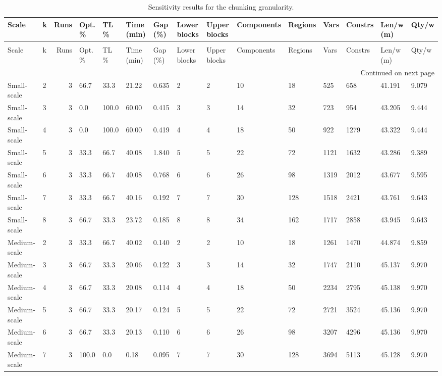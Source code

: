 \begin{longtable}{llrllllllllllll}
\caption{Sensitivity results for the chunking granularity.} \label{tab:app_chunking} \\
\toprule
Scale & k & Runs & Opt. \% & TL \% & Time (min) & Gap (\%) & Lower blocks & Upper blocks & Components & Regions & Vars & Constrs & Len/w (m) & Qty/w \\
\midrule
\endfirsthead
\caption[]{Sensitivity results for the chunking granularity.} \\
\toprule
Scale & k & Runs & Opt. \% & TL \% & Time (min) & Gap (\%) & Lower blocks & Upper blocks & Components & Regions & Vars & Constrs & Len/w (m) & Qty/w \\
\midrule
\endhead
\midrule
\multicolumn{15}{r}{Continued on next page} \\
\midrule
\endfoot
\bottomrule
\endlastfoot
Small-scale & 2 & 3 & 66.7 & 33.3 & 21.22 & 0.635 & 2 & 2 & 10 & 18 & 525 & 658 & 41.191 & 9.079 \\
Small-scale & 3 & 3 & 0.0 & 100.0 & 60.00 & 0.415 & 3 & 3 & 14 & 32 & 723 & 954 & 43.205 & 9.444 \\
Small-scale & 4 & 3 & 0.0 & 100.0 & 60.00 & 0.419 & 4 & 4 & 18 & 50 & 922 & 1279 & 43.322 & 9.444 \\
Small-scale & 5 & 3 & 33.3 & 66.7 & 40.08 & 1.840 & 5 & 5 & 22 & 72 & 1121 & 1632 & 43.286 & 9.389 \\
Small-scale & 6 & 3 & 33.3 & 66.7 & 40.08 & 0.768 & 6 & 6 & 26 & 98 & 1319 & 2012 & 43.677 & 9.595 \\
Small-scale & 7 & 3 & 33.3 & 66.7 & 40.16 & 0.192 & 7 & 7 & 30 & 128 & 1518 & 2421 & 43.761 & 9.643 \\
Small-scale & 8 & 3 & 66.7 & 33.3 & 23.72 & 0.185 & 8 & 8 & 34 & 162 & 1717 & 2858 & 43.945 & 9.643 \\
Medium-scale & 2 & 3 & 33.3 & 66.7 & 40.02 & 0.140 & 2 & 2 & 10 & 18 & 1261 & 1470 & 44.874 & 9.859 \\
Medium-scale & 3 & 3 & 66.7 & 33.3 & 20.06 & 0.122 & 3 & 3 & 14 & 32 & 1747 & 2110 & 45.137 & 9.970 \\
Medium-scale & 4 & 3 & 66.7 & 33.3 & 20.08 & 0.114 & 4 & 4 & 18 & 50 & 2234 & 2795 & 45.138 & 9.970 \\
Medium-scale & 5 & 3 & 66.7 & 33.3 & 20.17 & 0.124 & 5 & 5 & 22 & 72 & 2721 & 3524 & 45.136 & 9.970 \\
Medium-scale & 6 & 3 & 66.7 & 33.3 & 20.13 & 0.110 & 6 & 6 & 26 & 98 & 3207 & 4296 & 45.136 & 9.970 \\
Medium-scale & 7 & 3 & 100.0 & 0.0 & 0.18 & 0.095 & 7 & 7 & 30 & 128 & 3694 & 5113 & 45.128 & 9.970 \\

\end{longtable}
